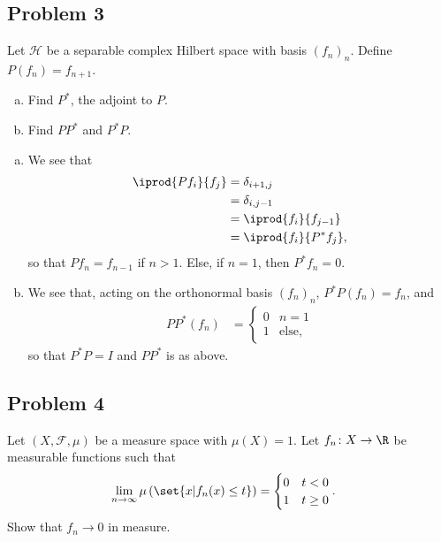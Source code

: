 \documentclass[10pt]{mypackage}
\begin{document}
\subsection{Problem 3}%
\begin{problem}
  Let $\mathcal{H}$ be a separable complex Hilbert space with basis $\left( f_n \right)_n$. Define $P\left( f_n \right) = f_{n+1}$.
  \begin{enumerate}[(a)]
    \item Find $P^{\ast}$, the adjoint to $P$.
    \item Find $PP^{\ast}$ and $P^{\ast}P$.
  \end{enumerate}
\end{problem}
\begin{enumerate}[(a)]
  \item We see that
    \begin{align*}
      \iprod{Pf_i}{f_j} &= \delta_{i+1,j}\\
                        &= \delta_{i,j-1}\\
                        &= \iprod{f_i}{f_{j-1}}\\
                        &= \iprod{f_i}{P^{\ast}f_j},
    \end{align*}
    so that $Pf_n = f_{n-1}$ if $n > 1$. Else, if $n = 1$, then $P^{\ast}f_n = 0$.
  \item We see that, acting on the orthonormal basis $\left( f_n \right)_n$, $P^{\ast}P\left( f_n \right) = f_n$, and
    \begin{align*}
      PP^{\ast}\left( f_n \right) &= \begin{cases}
        0 & n = 1\\
        1 & \text{else},
      \end{cases}
    \end{align*}
    so that $P^{\ast}P = I$ and $PP^{\ast}$ is as above.
\end{enumerate}
\subsection{Problem 4}%
\begin{problem}
  Let $\left( X,\mathcal{F},\mu \right)$ be a measure space with $\mu\left( X \right) = 1$. Let $f_n\colon X\rightarrow \R$ be measurable functions such that
  \begin{align*}
    \lim_{n\rightarrow\infty} \mu\left( \set{x | f_n(x) \leq t} \right) &= \begin{cases}
      0 & t < 0\\
      1 & t\geq 0
    \end{cases}.
  \end{align*}
  Show that $f_n\rightarrow 0$ in measure.
\end{problem}
\end{document}
